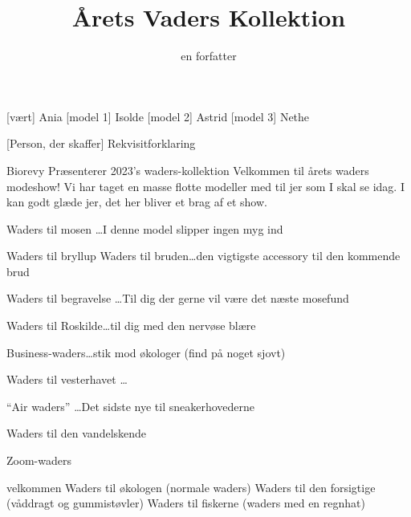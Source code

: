 \documentclass[a4paper,11pt]{article}
\title{Årets Vaders Kollektion}
\author{en forfatter}
\begin{document}
\maketitle

\begin{roles}
    [vært] Ania
    [model 1] Isolde
    [model 2] Astrid
    [model 3] Nethe
\end{roles}

\begin{props}
    [Person, der skaffer] Rekvisitforklaring
\end{props}


\begin{sketch}


 Biorevy Præsenterer 2023’s waders-kollektion 
 Velkommen til årets waders modeshow! Vi har taget en masse flotte modeller med til jer som I skal se idag. I kan godt glæde jer, det her bliver et brag af et show.


 Waders til mosen \ldots I denne model slipper ingen myg ind 

 Waders til bryllup Waders til bruden\ldots den vigtigste accessory til den kommende brud  

 Waders til begravelse \ldots Til dig der gerne vil være det næste mosefund

 Waders til Roskilde\ldots til dig med den nervøse blære

 Business-waders\ldots stik mod økologer (find på noget sjovt)

 Waders til vesterhavet \ldots 

 “Air waders” \ldots Det sidste nye til sneakerhovederne

 Waders til den vandelskende 

Zoom-waders


 velkommen 
 Waders til økologen (normale waders)
 Waders til den forsigtige (våddragt og gummistøvler)
 Waders til fiskerne (waders med en regnhat)


\end{sketch}
\end{document}
